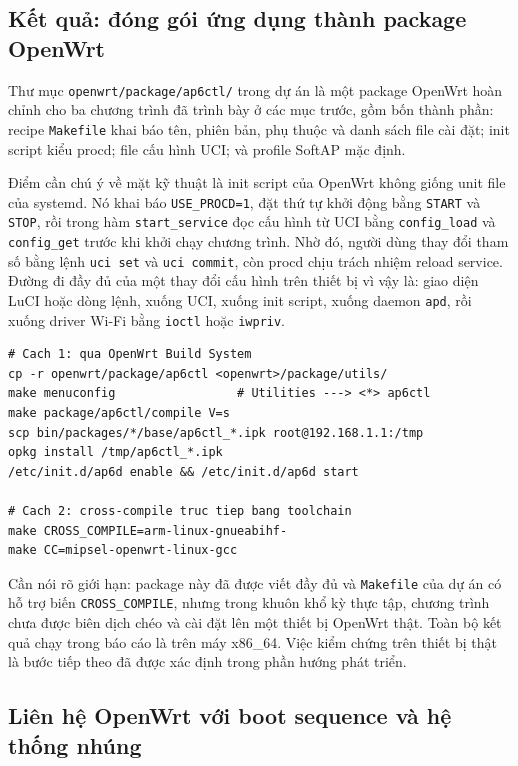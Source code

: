 \documentclass[11pt]{article}
\newcommand{\code}[1]{\texttt{#1}}
\begin{document}
\subsection{Kết quả: đóng gói ứng dụng thành package OpenWrt}

Thư mục \code{openwrt/package/ap6ctl/} trong dự án là một package OpenWrt hoàn chỉnh cho ba chương trình đã trình bày ở các mục trước, gồm bốn thành phần: recipe \code{Makefile} khai báo tên, phiên bản, phụ thuộc và danh sách file cài đặt; init script kiểu procd; file cấu hình UCI; và profile SoftAP mặc định.

Điểm cần chú ý về mặt kỹ thuật là init script của OpenWrt không giống unit file của systemd. Nó khai báo \code{USE\_PROCD=1}, đặt thứ tự khởi động bằng \code{START} và \code{STOP}, rồi trong hàm \code{start\_service} đọc cấu hình từ UCI bằng \code{config\_load} và \code{config\_get} trước khi khởi chạy chương trình. Nhờ đó, người dùng thay đổi tham số bằng lệnh \code{uci set} và \code{uci commit}, còn procd chịu trách nhiệm reload service. Đường đi đầy đủ của một thay đổi cấu hình trên thiết bị vì vậy là: giao diện LuCI hoặc dòng lệnh, xuống UCI, xuống init script, xuống daemon \code{apd}, rồi xuống driver Wi-Fi bằng \code{ioctl} hoặc \code{iwpriv}.

\begin{lstlisting}[caption={Cross-compile và cài đặt package lên thiết bị}]
# Cach 1: qua OpenWrt Build System
cp -r openwrt/package/ap6ctl <openwrt>/package/utils/
make menuconfig                 # Utilities ---> <*> ap6ctl
make package/ap6ctl/compile V=s
scp bin/packages/*/base/ap6ctl_*.ipk root@192.168.1.1:/tmp
opkg install /tmp/ap6ctl_*.ipk
/etc/init.d/ap6d enable && /etc/init.d/ap6d start

# Cach 2: cross-compile truc tiep bang toolchain
make CROSS_COMPILE=arm-linux-gnueabihf-
make CC=mipsel-openwrt-linux-gcc
\end{lstlisting}

Cần nói rõ giới hạn: package này đã được viết đầy đủ và \code{Makefile} của dự án có hỗ trợ biến \code{CROSS\_COMPILE}, nhưng trong khuôn khổ kỳ thực tập, chương trình chưa được biên dịch chéo và cài đặt lên một thiết bị OpenWrt thật. Toàn bộ kết quả chạy trong báo cáo là trên máy x86\_64. Việc kiểm chứng trên thiết bị thật là bước tiếp theo đã được xác định trong phần hướng phát triển.

\subsection{Liên hệ OpenWrt với boot sequence và hệ thống nhúng}
\end{document}
